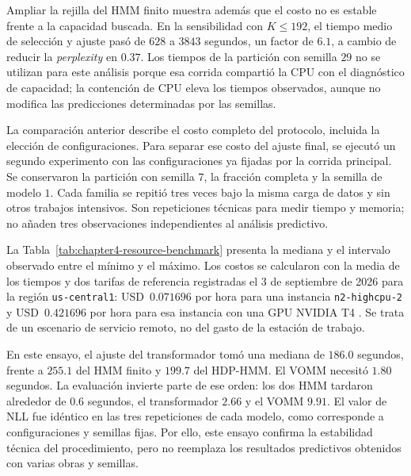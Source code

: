 Ampliar la rejilla del HMM finito muestra además que el costo no es estable frente a la capacidad buscada. En la sensibilidad con $K\leq192$, el tiempo medio de selección y ajuste pasó de $628$ a $3843$ segundos, un factor de $6.1$, a cambio de reducir la \emph{perplexity} en $0.37$. Los tiempos de la partición con semilla $29$ no se utilizan para este análisis porque esa corrida compartió la CPU con el diagnóstico de capacidad; la contención de CPU eleva los tiempos observados, aunque no modifica las predicciones determinadas por las semillas.

La comparación anterior describe el costo completo del protocolo, incluida la elección de configuraciones. Para separar ese costo del ajuste final, se ejecutó un segundo experimento con las configuraciones ya fijadas por la corrida principal. Se conservaron la partición con semilla $7$, la fracción completa y la semilla de modelo $1$. Cada familia se repitió tres veces bajo la misma carga de datos y sin otros trabajos intensivos. Son repeticiones técnicas para medir tiempo y memoria; no añaden tres observaciones independientes al análisis predictivo.

La Tabla~\ref{tab:chapter4-resource-benchmark} presenta la mediana y el intervalo observado entre el mínimo y el máximo. Los costos se calcularon con la media de los tiempos y dos tarifas de referencia registradas el 3 de septiembre de 2026 para la región \texttt{us-central1}: USD~$0.071696$ por hora para una instancia \texttt{n2-highcpu-2} y USD~$0.421696$ por hora para esa instancia con una GPU NVIDIA T4 \cite{googlecloud2026computepricing,googlecloud2026gpupricing}. Se trata de un escenario de servicio remoto, no del gasto de la estación de trabajo.

\begin{table}[H]
\centering
\small
\caption{Medición de recursos con configuraciones fijadas. Los tiempos muestran mediana [mínimo, máximo] de tres repeticiones. El primer costo incluye un ajuste; el segundo, el ajuste y cien evaluaciones. Los costos proceden de las medias de tiempo y de las tarifas documentadas en el escenario.}
\label{tab:chapter4-resource-benchmark}
\resizebox{\textwidth}{!}{}
\end{table}

En este ensayo, el ajuste del transformador tomó una mediana de $186.0$ segundos, frente a $255.1$ del HMM finito y $199.7$ del HDP-HMM. El VOMM necesitó $1.80$ segundos. La evaluación invierte parte de ese orden: los dos HMM tardaron alrededor de $0.6$ segundos, el transformador $2.66$ y el VOMM $9.91$. El valor de NLL fue idéntico en las tres repeticiones de cada modelo, como corresponde a configuraciones y semillas fijas. Por ello, este ensayo confirma la estabilidad técnica del procedimiento, pero no reemplaza los resultados predictivos obtenidos con varias obras y semillas.

